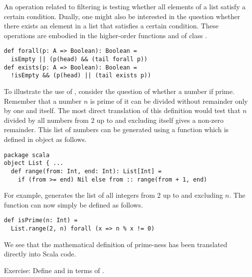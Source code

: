 An operation related to filtering is testing whether all elements of a
list satisfy a certain condition. Dually, one might also be interested
in the question whether there exists an element in a list that
satisfies a certain condition. These operations are embodied in the
higher-order functions  and  of class
.
\begin{lstlisting}
def forall(p: A => Boolean): Boolean =
  isEmpty || (p(head) && (tail forall p))
def exists(p: A => Boolean): Boolean =
  !isEmpty && (p(head) || (tail exists p))
\end{lstlisting}
To illustrate the use of , consider the question of whether
a number if prime. Remember that a number $n$ is prime of it can be
divided without remainder only by one and itself. The most direct
translation of this definition would test that $n$ divided by all
numbers from 2 up to and excluding itself gives a non-zero
remainder. This list of numbers can be generated using a function
 which is defined in object  as follows.
\begin{lstlisting}
package scala
object List { ...
  def range(from: Int, end: Int): List[Int] =
    if (from >= end) Nil else from :: range(from + 1, end)
\end{lstlisting}
For example, 
generates the list of all integers from 2 up to and excluding $n$.
The function  can now simply be defined as follows.
\begin{lstlisting}
def isPrime(n: Int) =
  List.range(2, n) forall (x => n % x != 0)
\end{lstlisting}
We see that the mathematical definition of prime-ness has been
translated directly into Scala code. 

Exercise: Define  and  in terms of .


